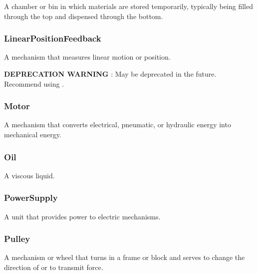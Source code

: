 A chamber or bin in which materials are stored temporarily, typically being filled through the top and dispensed through the bottom.

\FloatBarrier

\subsubsection{LinearPositionFeedback}
  \label{sec:LinearPositionFeedback}



A mechanism that measures linear motion or position.

\textbf{DEPRECATION WARNING} : May be deprecated in the future. Recommend using .

\FloatBarrier

\subsubsection{Motor}
  \label{sec:Motor}



A mechanism that converts electrical, pneumatic, or hydraulic energy into mechanical energy.

\FloatBarrier

\subsubsection{Oil}
  \label{sec:Oil}



A viscous liquid.

\FloatBarrier

\subsubsection{PowerSupply}
  \label{sec:PowerSupply}



A unit that provides power to electric mechanisms.

\FloatBarrier

\subsubsection{Pulley}
  \label{sec:Pulley}



A mechanism or wheel that turns in a frame or block and serves to change the direction of or to transmit force.

\FloatBarrier

